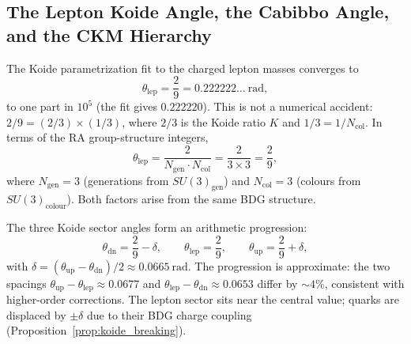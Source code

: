 \documentclass[11pt,a4paper]{article}
\begin{document}
\subsection{The Lepton Koide Angle, the Cabibbo Angle, and the CKM Hierarchy}
\label{sec:ckm_koide}

The Koide parametrization fit to the charged lepton masses converges to
\begin{equation}
  \theta_{\mathrm{lep}} = \frac{2}{9} = 0.222222\ldots~\mathrm{rad},
  \label{eq:theta_lep_exact}
\end{equation}
to one part in $10^5$ (the fit gives $0.222220$). This is not a numerical
accident: $2/9 = (2/3) \times (1/3)$, where $2/3$ is the Koide ratio $K$
and $1/3 = 1/N_{\mathrm{col}}$. In terms of the RA group-structure integers,
\begin{equation}
  \theta_{\mathrm{lep}} = \frac{2}{N_{\mathrm{gen}}\cdot N_{\mathrm{col}}}
  = \frac{2}{3 \times 3} = \frac{2}{9},
  \label{eq:theta_group}
\end{equation}
where $N_{\mathrm{gen}} = 3$ (generations from $SU(3)_{\mathrm{gen}}$) and
$N_{\mathrm{col}} = 3$ (colours from $SU(3)_{\mathrm{colour}}$). Both factors
arise from the same BDG structure.

The three Koide sector angles form an arithmetic progression:
\begin{equation}
  \theta_{\mathrm{dn}} = \frac{2}{9} - \delta, \qquad
  \theta_{\mathrm{lep}} = \frac{2}{9}, \qquad
  \theta_{\mathrm{up}} = \frac{2}{9} + \delta,
  \label{eq:theta_arithmetic}
\end{equation}
with $\delta = (\theta_{\mathrm{up}} - \theta_{\mathrm{dn}})/2 \approx
0.0665~\mathrm{rad}$. The progression is approximate: the two spacings
$\theta_{\mathrm{up}} - \theta_{\mathrm{lep}} \approx 0.0677$ and
$\theta_{\mathrm{lep}} - \theta_{\mathrm{dn}} \approx 0.0653$ differ by
$\sim 4\%$, consistent with higher-order corrections.
The lepton sector sits near the central value; quarks are displaced by
$\pm\delta$ due to their BDG charge coupling (Proposition~\ref{prop:koide_breaking}).
\end{document}
